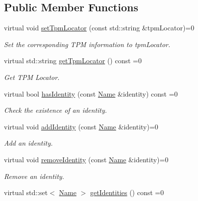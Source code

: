 \subsection*{Public Member Functions}
\begin{DoxyCompactItemize}
\item 
virtual void \hyperlink{classndn_1_1security_1_1PibImpl_a279b5afb508c69b6b2407075f8aa35fb}{set\+Tpm\+Locator} (const std\+::string \&tpm\+Locator)=0
\begin{DoxyCompactList}\small\item\em Set the corresponding T\+PM information to {\ttfamily tpm\+Locator}. \end{DoxyCompactList}\item 
virtual std\+::string \hyperlink{classndn_1_1security_1_1PibImpl_a4109ca56c200302f2c697c42bc398e47}{get\+Tpm\+Locator} () const =0\hypertarget{classndn_1_1security_1_1PibImpl_a4109ca56c200302f2c697c42bc398e47}{}\label{classndn_1_1security_1_1PibImpl_a4109ca56c200302f2c697c42bc398e47}

\begin{DoxyCompactList}\small\item\em Get T\+PM Locator. \end{DoxyCompactList}\item 
virtual bool \hyperlink{classndn_1_1security_1_1PibImpl_aa08d73cbf54f125b5bf20b5350b9fb28}{has\+Identity} (const \hyperlink{classndn_1_1Name}{Name} \&identity) const =0
\begin{DoxyCompactList}\small\item\em Check the existence of an identity. \end{DoxyCompactList}\item 
virtual void \hyperlink{classndn_1_1security_1_1PibImpl_a23dae9941888e0767db73e6515f9abd6}{add\+Identity} (const \hyperlink{classndn_1_1Name}{Name} \&identity)=0
\begin{DoxyCompactList}\small\item\em Add an identity. \end{DoxyCompactList}\item 
virtual void \hyperlink{classndn_1_1security_1_1PibImpl_a3b02c4cc6602c3f785e5fa54ea37a72b}{remove\+Identity} (const \hyperlink{classndn_1_1Name}{Name} \&identity)=0
\begin{DoxyCompactList}\small\item\em Remove an identity. \end{DoxyCompactList}\item 
virtual std\+::set$<$ \hyperlink{classndn_1_1Name}{Name} $>$ \hyperlink{classndn_1_1security_1_1PibImpl_a463e5cc87b00ed28f6776fc7f27dec87}{get\+Identities} () const =0\hypertarget{classndn_1_1security_1_1PibImpl_a463e5cc87b00ed28f6776fc7f27dec87}{}\label{classndn_1_1security_1_1PibImpl_a463e5cc87b00ed28f6776fc7f27dec87}


\end{DoxyCompactItemize}

